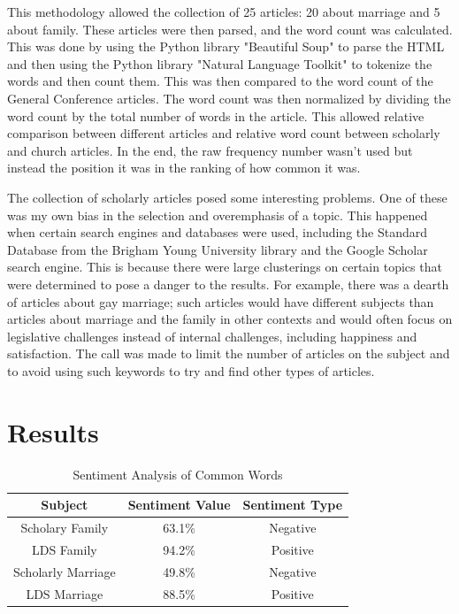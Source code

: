\documentclass[twocolumn]{article}
\begin{document}
This methodology allowed the collection of 25 articles: 20 about marriage and 5 about family. These articles were then parsed, and the word count was calculated. This was done by using the Python library "Beautiful Soup" to parse the HTML and then using the Python library "Natural Language Toolkit" to tokenize the words and then count them. This was then compared to the word count of the General Conference articles. The word count was then normalized by dividing the word count by the total number of words in the article. This allowed relative comparison between different articles and relative word count between scholarly and church articles. In the end, the raw frequency number wasn’t used but instead the position it was in the ranking of how common it was.

The collection of scholarly articles posed some interesting problems. One of these was my own bias in the selection and overemphasis of a topic. This happened when certain search engines and databases were used, including the Standard Database from the Brigham Young University library and the Google Scholar search engine. This is because there were large clusterings on certain topics that were determined to pose a danger to the results. For example, there was a dearth of articles about gay marriage; such articles would have different subjects than articles about marriage and the family in other contexts and would often focus on legislative challenges instead of internal challenges, including happiness and satisfaction. The call was made to limit the number of articles on the subject and to avoid using such keywords to try and find other types of articles.

\section{Results}
\begin{table}[h] %
    \centering
    \caption{Sentiment Analysis of Common Words}
    \label{tab:example}
    \begin{tabular}{|c|c|c|} %
        \hline
        \textbf{Subject}   & \textbf{Sentiment Value} & \textbf{Sentiment Type} \\ %
        \hline
        Scholary Family    & 63.1\%                   & Negative                \\ %
        \hline

        LDS Family         & 94.2\%                   & Positive                \\ %
        \hline

        Scholarly Marriage & 49.8\%                   & Negative                \\ %
        \hline

        LDS Marriage       & 88.5\%                   & Positive                \\ %

        \hline
    \end{tabular}
\end{table}
\end{document}
